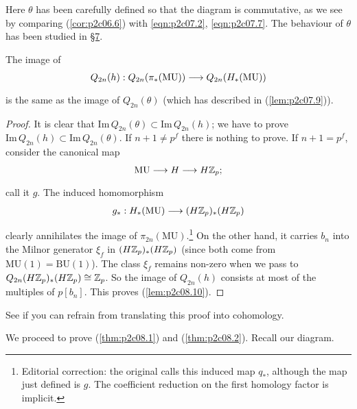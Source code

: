 \documentclass[../main]{subfiles}
\begin{document}
\begin{center}
\end{center}

Here $\theta$ has been carefully defined so that the diagram is commutative, as we see by comparing (\ref{cor:p2c06.6}) with \eqref{eqn:p2c07.2}, \eqref{eqn:p2c07.7}. The behaviour of $\theta$ has been studied in \hyperref[sec:p2c7]{\S 7}. 

\begin{lemma}
\label{lem:p2c08.10}
The image of \[Q_{2n}(h) : Q_{2n}(\pi_\ast(\mathrm{MU})) \lar{} Q_{2n}(H_\ast(\mathrm{MU}))\] is the same as the image of $Q_{2n}(\theta)$ (which has described in (\ref{lem:p2c07.9})). 
\end{lemma}

\begin{proof}
It is clear that $\mathrm{Im} \, Q_{2n}(\theta) \subset \mathrm{Im} \, Q_{2n}(h)$; we have to prove $\mathrm{Im} \, Q_{2n}(h) \subset \mathrm{Im} \, Q_{2n}(\theta)$. If $n + 1 \ne p^f$ there is nothing to prove. If $n + 1 = p^f$, consider the canonical map \[\mathrm{MU} \lar{} H \lar{} H \bbZ_p;\] call it $g$. The induced homomorphism \[g_\ast : H_\ast(\mathrm{MU}) \lar{} (H \bbZ_p)_\ast (H \bbZ_p)\] clearly annihilates the image of $\pi_{2n}(\mathrm{MU})$.\footnote{Editorial correction: the original calls this induced map $q_\ast$, although the map just defined is $g$. The coefficient reduction on the first homology factor is implicit.} On the other hand, it carries $b_n$ into the Milnor generator $\xi_f$ in $(H \mathbb{Z}_p)_\ast (H \mathbb{Z}_p)$ (since both come from $\mathrm{MU}(1) = \mathrm{BU}(1)$). The class $\xi_f$ remains non-zero when we pass to $Q_{2n}(H \mathbb{Z}_p)_\ast (H \mathbb{Z}_p) \cong \mathbb{Z}_p$. So the image of $Q_{2n}(h)$ consists at most of the multiples of $p[b_n]$. This proves (\ref{lem:p2c08.10}).
\end{proof}

\begin{exercise}
See if you can refrain from translating this proof into cohomology. 
\end{exercise}

We proceed to prove (\ref{thm:p2c08.1}) and (\ref{thm:p2c08.2}). Recall our diagram.
\end{document}

